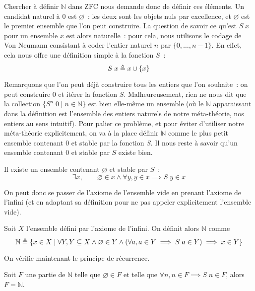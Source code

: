 Chercher à définir $\mathbb N$ dans ZFC nous demande donc de définir ces
éléments. Un candidat naturel à $0$ est $\varnothing$~: les deux sont les objets
nuls par excellence, et $\varnothing$ est le premier ensemble que l'on peut
construire. La question de savoir ce qu'est $S\;x$ pour un ensemble $x$ est
alors naturelle~: pour cela, nous utilisons le codage de Von Neumann consistant
à coder l'entier naturel $n$ par $\{0,\ldots,n-1\}$. En effet, cela nous offre
une définition simple à la fonction $S$~:
\[S\;x\triangleq x\cup \{x\}\]

Remarquons que l'on peut déjà construire tous les entiers que l'on souhaite~:
on peut construire $0$ et itérer la fonction $S$. Malheureusement, rien ne nous
dit que la collection $\{S^n\;0\mid n \in \mathbb N\}$ est bien elle-même un
ensemble (où le $\mathbb N$ apparaissant dans la définition est l'ensemble des
entiers naturels de notre méta-théorie, nos entiers au sens intuitif). Pour
palier ce problème, et pour éviter d'utiliser notre méta-théorie explicitement,
on va à la place définir $\mathbb N$ comme le plus petit ensemble contenant $0$
et stable par la fonction $S$. Il nous reste à savoir qu'un ensemble contenant
$0$ et stable par $S$ existe bien.

\begin{axiom}[Infini]\label{ax.ZF.infini}
  Il existe un ensemble contenant $\varnothing$ et stable par $S$~:
  \[\exists x, \qquad \varnothing \in x \land
  \forall y, y \in x \implies S\;y\in x\]
\end{axiom}

\begin{remark}
  On peut donc se passer de l'axiome de l'ensemble vide en prenant l'axiome de
  l'infini (et en adaptant sa définition pour ne pas appeler explicitement
  l'ensemble vide).
\end{remark}

\begin{definition}
  Soit $X$ l'ensemble défini par l'axiome de l'infini. On définit alors
  $\mathbb N$ comme
  \[\mathbb N \triangleq \{x\in X \mid \forall Y, Y\subseteq X\land
  \varnothing \in Y \land (\forall a, a \in Y \implies S\;a\in Y) \implies
  x\in Y\}\]
\end{definition}

On vérifie maintenant le principe de récurrence.

\begin{theorem}[Récurrence]
  Soit $F$ une partie de $\mathbb N$ telle que $\varnothing \in F$ et telle que
  $\forall n, n \in F \implies S\;n \in F$, alors $F = \mathbb N$.
\end{theorem}

